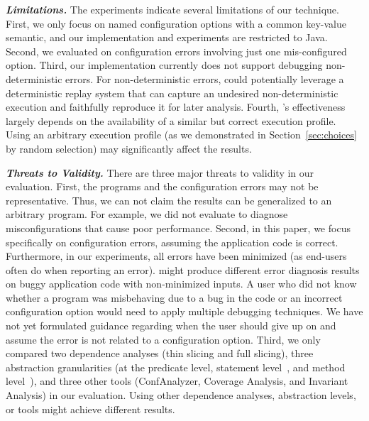 

\noindent \textbf{\textit{Limitations.}} 
The experiments indicate several limitations of our technique. 
%
First, we only focus on named configuration options
with a common key-value semantic, and our implementation
and experiments are restricted to Java. 
%
Second, we evaluated \ourtool on configuration errors
involving just one mis-configured option.
%
Third,  our implementation currently does not
support debugging non-deterministic errors. 
For non-deterministic errors, \ourtool could potentially leverage 
a deterministic replay system
that can capture an undesired non-deterministic
execution and faithfully reproduce it for later analysis.
%
Fourth, \ourtool's effectiveness  largely
depends on the availability of a similar but correct execution profile.
Using an arbitrary execution profile (as we demonstrated in Section~\ref{sec:choices}
by random selection) may significantly affect the results.

\vspace{1mm}

\noindent \textbf{\textit{Threats to Validity.}} 
There are three major threats to validity in our evaluation. 
%
First, the \subjectnum programs and the configuration errors may not be
representative. Thus, we can not claim the results can be
generalized to an arbitrary program.
For example, we did not evaluate \ourtool to diagnose misconfigurations
that cause poor performance.
%
Second, in this paper, we focus specifically on
configuration errors, assuming the application code is correct.
Furthermore, in our experiments, all \errors errors
have been minimized (as end-users often do
when reporting an error). \ourtool might produce
different error diagnosis results on buggy application 
code with non-minimized inputs.  A user who did not know whether a program
was misbehaving due to a bug in the code or an incorrect configuration
option would need to apply multiple debugging techniques.  We have not
yet formulated guidance regarding when the user should give up on \ourtool
and assume the error is not related to a configuration option.
%
Third, we only compared two dependence
analyses (thin slicing and full slicing), three
abstraction granularities (at the predicate level,
statement level~\cite{Jones:2002}, and method level~\cite{Ernst:1999}),
and three other tools (ConfAnalyzer, Coverage Analysis, and
Invariant Analysis) in our evaluation.
 Using other dependence analyses, abstraction levels, or tools
might achieve different results.

